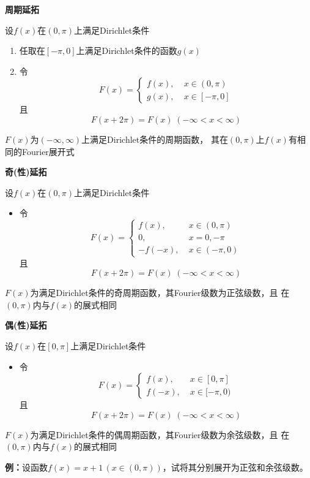 {\bf 周期延拓}

设$f(x)$在$(0,\pi)$上满足Dirichlet条件 
\begin{enumerate}[(1)]
  \setlength{\itemindent}{1cm}
  \item 任取在$[-\pi,0]$上满足Dirichlet条件的函数$g(x)$ 
  \item 令
  $$F(x)=\left\{\begin{array}{ll}
  	f(x),\;& x\in(0,\pi)\\
  	g(x),\;& x\in[-\pi,0]
  \end{array}\right.$$
   且
  $$F(x+2\pi)=F(x)\;(-\infty<x<\infty)$$
\end{enumerate}
$F(x)$为$(-\infty,\infty)$上满足Dirichlet条件的周期函数，
其在$(0,\pi)$上$f(x)$有相同的Fourier展开式

{\bf 奇(性)延拓}

设$f(x)$在$(0,\pi)$上满足Dirichlet条件 
\begin{itemize}
  \item 令
  $$F(x)=\left\{\begin{array}{ll}
  	f(x),\;& x\in(0,\pi)\\
  	0,\;& x=0,-\pi\\
  	-f(-x),\;& x\in(-\pi,0)
  \end{array}\right.$$
   且
  $$F(x+2\pi)=F(x)\;(-\infty<x<\infty)$$
\end{itemize}
$F(x)$为满足Dirichlet条件的奇周期函数，其Fourier级数为正弦级数，且
在$(0,\pi)$内与$f(x)$的展式相同

{\bf 偶(性)延拓}

设$f(x)$在$[0,\pi]$上满足Dirichlet条件 
\begin{itemize}
  \item 令
  $$F(x)=\left\{\begin{array}{ll}
  	f(x),\;& x\in[0,\pi]\\
  	f(-x),\;& x\in[-\pi,0)
  \end{array}\right.$$
   且
  $$F(x+2\pi)=F(x)\;(-\infty<x<\infty)$$
\end{itemize}
$F(x)$为满足Dirichlet条件的偶周期函数，其Fourier级数为余弦级数，且
在$(0,\pi)$内与$f(x)$的展式相同

{\bf 例：}设函数$f(x)=x+1\,(x\in(0,\pi))$，试将其分别展开为正弦和余弦级数。

